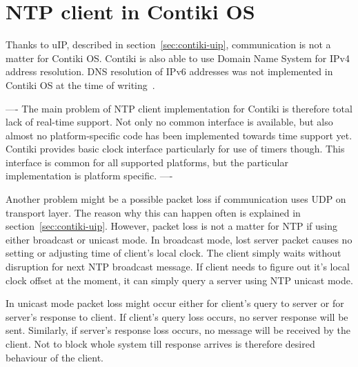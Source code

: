 
\chapter{NTP client in Contiki OS}

Thanks to uIP, described in section~\ref{sec:contiki-uip}, communication is
not a matter for Contiki OS.
Contiki is also able to use Domain Name System for IPv4 address resolution.
DNS resolution of IPv6 addresses was not implemented in Contiki OS
at the time of writing~\cite{contiki-docs}.

----
The main problem of NTP client implementation for Contiki is therefore total
lack of real-time support.
Not only no common interface is available, but also
almost no platform-specific code has been implemented towards time support yet.
Contiki provides basic clock interface particularly for use of timers though.
This interface is common for all supported platforms,
but the particular implementation is platform specific.
----

Another problem might be a possible packet loss if communication uses UDP on transport layer.
The reason why this can happen often is explained in section~\ref{sec:contiki-uip}.
However, packet loss is not a matter for NTP if using either broadcast or unicast mode.
In broadcast mode, lost server packet causes no setting or adjusting time of client's
local clock.
The client simply waits without disruption for next NTP broadcast message.
If client needs to figure out it's local clock offset at the moment,
it can simply query a server using NTP unicast mode.

In unicast mode packet loss might occur either for client's query to server
or for server's response to client.
If client's query loss occurs, no server response will be sent.
Similarly, if server's response loss occurs, no message will be received by the client.
Not to block whole system till response arrives
is therefore desired behaviour of the client.









